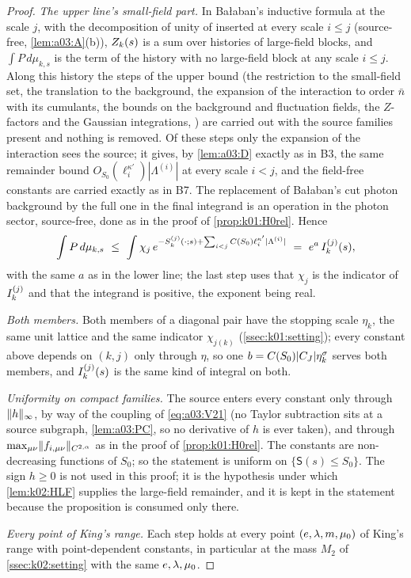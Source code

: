 \begin{proof}
\emph{The upper line's small-field part.} In Ba{\l}aban's inductive formula \cite[(2.43)]{Ba2} at the scale $j$, with the decomposition of unity of \cite[(2.2)--(2.10)]{Ba2} inserted at every scale $i\le j$ (source-free, \cref{lem:a03:A}(b)), $Z_{k}(s)$ is a sum over histories of large-field blocks, and $\int P\,d\mu_{k,s}$ is the term of the history with no large-field block at any scale $i\le j$. Along this history the steps of the upper bound (the restriction to the small-field set, the translation to the background, the expansion of the interaction to order $\bar n$ with its cumulants, the bounds on the background and fluctuation fields, the $Z$-factors and the Gaussian integrations, \cite[Sect.~2]{Ba2}) are carried out with the source families present and nothing is removed. Of these steps only the expansion of the interaction sees the source; it gives, by \cref{lem:a03:D} exactly as in B3, the same remainder bound $O_{S_0}(\ell_i^{\kappa'})|\Lambda^{(i)}|$ at every scale $i<j$, and the field-free constants are carried exactly as in B7. The replacement of Ba{\l}aban's cut photon background by the full one in the final integrand is an operation in the photon sector, source-free, done as in the proof of \cref{prop:k01:H0rel}. Hence
\[
\int P\,d\mu_{k,s}\ \le\ \int\chi_j\,e^{-S^{(j)}_k(\cdot;s)+\sum_{i<j}C(S_0)\ell_i^{\kappa'}|\Lambda^{(i)}|}\ =\ e^{a}\,\Ik{j}(s),
\]
with the same $a$ as in the lower line; the last step uses that $\chi_j$ is the indicator of $I^{(j)}_{k}$ and that the integrand is positive, the exponent being real.

\emph{Both members.} Both members of a diagonal pair have the stopping scale $\eta_k$, the same unit lattice and the same indicator $\chi_{j(k)}$ (\cref{ssec:k01:setting}); every constant above depends on $(k,j)$ only through $\eta$, so one $b=C(S_0)|C_J|\eta_k^\sigma$ serves both members, and $I^{(j)}_{k}(s)$ is the same kind of integral on both.

\emph{Uniformity on compact families.} The source enters every constant only through $\lVert h\rVert_\infty$, by way of the coupling of \eqref{eq:a03:V21} (no Taylor subtraction sits at a source subgraph, \cref{lem:a03:PC}, so no derivative of $h$ is ever taken), and through $\max_{\mu\nu}\lVert f_{i,\mu\nu}\rVert_{C^{2,\alpha}}$ as in the proof of \cref{prop:k01:H0rel}. The constants are non-decreasing functions of $S_0$; so the statement is uniform on $\{\mathsf S(s)\le S_0\}$. The sign $h\ge0$ is not used in this proof; it is the hypothesis under which \cref{lem:k02:HLF} supplies the large-field remainder, and it is kept in the statement because the proposition is consumed only there.

\emph{Every point of King's range.} Each step holds at every point $(e,\lambda,m,\mu_0)$ of King's range with point-dependent constants, in particular at the mass $M_2$ of \cref{ssec:k02:setting} with the same $e,\lambda,\mu_0$.
\end{proof}


